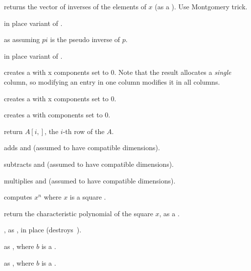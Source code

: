  returns the vector of inverses of the elements
of $x$ (as a ). Use Montgomery trick.

 in place variant of .

 as 
assuming $pi$ is the pseudo inverse of $p$.

 in place variant of
.

 creates a  with  x 
components set to $0$. Note that the result allocates a
\emph{single} column, so modifying an entry in one column modifies it in
all columns.

 creates a  with  x
 components set to $0$.

 creates a  with  components set to
$0$.

 return $A[i,]$, the $i$-th row of the
 $A$.

 adds  and 
(assumed to have compatible dimensions).

 subtracts  and 
(assumed to have compatible dimensions).

 multiplies   and 
(assumed to have compatible dimensions).

 computes $x^n$ where $x$ is a
square .

 return the characteristic polynomial of
the square  $x$, as a .



, as , in place
(destroys~).

 as , where $b$ is a
.

 as , where $b$ is
a .


